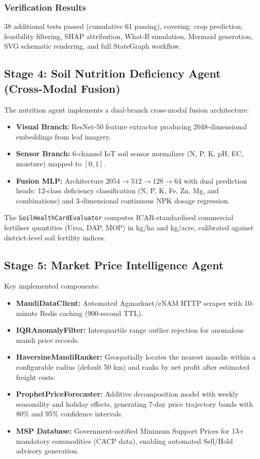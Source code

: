 \documentclass[12pt,a4paper]{article}
\begin{document}
\subsubsection{Verification Results}
38 additional tests passed (cumulative 61 passing), covering: crop prediction, feasibility filtering, SHAP attribution, What-If simulation, Mermaid generation, SVG schematic rendering, and full StateGraph workflow.

\subsection{Stage 4: Soil Nutrition Deficiency Agent (Cross-Modal Fusion)}

The nutrition agent implements a dual-branch cross-modal fusion architecture:
\begin{itemize}
\item \textbf{Visual Branch:} ResNet-50 feature extractor producing 2048-dimensional embeddings from leaf imagery.
\item \textbf{Sensor Branch:} 6-channel IoT soil sensor normalizer (N, P, K, pH, EC, moisture) mapped to $[0,1]$.
\item \textbf{Fusion MLP:} Architecture $2054 \to 512 \to 128 \to 64$ with dual prediction heads: 12-class deficiency classification (N, P, K, Fe, Zn, Mg, and combinations) and 3-dimensional continuous NPK dosage regression.
\end{itemize}
The \texttt{SoilHealthCardEvaluator} computes ICAR-standardised commercial fertiliser quantities (Urea, DAP, MOP) in kg/ha and kg/acre, calibrated against district-level soil fertility indices.

\subsection{Stage 5: Market Price Intelligence Agent}

Key implemented components:
\begin{itemize}
\item \textbf{MandiDataClient:} Automated Agmarknet/eNAM HTTP scraper with 10-minute Redis caching (900-second TTL).
\item \textbf{IQRAnomalyFilter:} Interquartile range outlier rejection for anomalous mandi price records.
\item \textbf{HaversineMandiRanker:} Geospatially locates the nearest mandis within a configurable radius (default 50 km) and ranks by net profit after estimated freight costs.
\item \textbf{ProphetPriceForecaster:} Additive decomposition model with weekly seasonality and holiday effects, generating 7-day price trajectory bands with 80\% and 95\% confidence intervals.
\item \textbf{MSP Database:} Government-notified Minimum Support Prices for 13+ mandatory commodities (CACP data), enabling automated Sell/Hold advisory generation.
\end{itemize}
\end{document}
